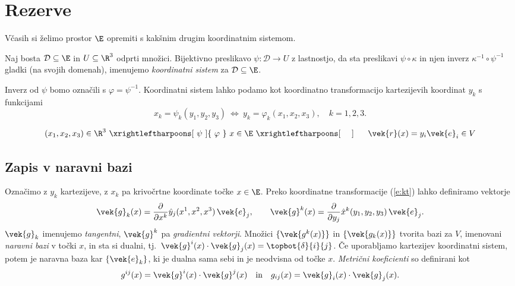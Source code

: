 \section{Rezerve}

Včasih si želimo prostor $\E$ opremiti s kakšnim drugim koordinatnim sistemom.
\begin{definicija}\label{d:ks}
	Naj bosta $\mathcal{D}\subseteq\E$ in $U\subseteq\R^3$ odprti množici. Bijektivno preslikavo
	$\psi\colon\mathcal{D}\to U$ z lastnostjo, da sta preslikavi $\psi\circ\kappa$ in njen inverz
	$\kappa^{-1}\circ\psi^{-1}$ gladki (na svojih domenah), imenujemo \emph{koordinatni sistem}
	za $\mathcal{D}\subseteq\E$.
\end{definicija}
Inverz od $\psi$ bomo označili s $\varphi=\psi^{-1}$.
Koordinatni sistem lahko podamo kot koordinatno transformacijo kartezijevih koordinat $y_k$ s funkcijami
\begin{equation*}
	x_k = \psi_k(y_1,y_2,y_3) \ \Leftrightarrow \ y_k=\varphi_k(x_1,x_2,x_3), \quad k=1,2,3.
\end{equation*}

\[
	(x_1,x_2,x_3)\in \R^3\ \xrightleftharpoons[\ \psi\ ]{\ \varphi\ }\ 
	x\in\E\ \xrightleftharpoons[\ \phantom{\varphi}\ ]{\ \phantom{\psi}\ }\ 
	\vek{r}(x)=y_i\vek{e}_i \in V
\]

\subsection{Zapis v naravni bazi}

Označimo z $y_k$ kartezijeve, z $x_k$ pa krivočrtne koordinate točke $x\in\E$.
Preko koordinatne transformacije (\ref{e:kt}) lahko definiramo vektorje
\begin{align*}
	\vek{g}_k(x)=\frac{\partial}{\partial x^k}\hat{y}_j(x^1,x^2,x^3)\,\vek{e}_j, \qquad
	\vek{g}^k(x)=\frac{\partial}{\partial y_j}\hat{x}^k(y_1,y_2,y_3)\,\vek{e}_j.
\end{align*}
$\vek{g}_k$ imenujemo \emph{tangentni}, $\vek{g}^k$ pa \emph{gradientni vektorji}.
Množici $\{\vek{g^k(x)}\}$ in $\{\vek{g_k(x)}\}$ tvorita bazi za $V$, imenovani \emph{naravni bazi} v točki $x$,
in sta si dualni, tj.~$\vek{g}^i(x)\cdot\vek{g}_j(x)=\topbot{\delta}{i}{j}$.
Če uporabljamo kartezijev koordinatni sistem, potem je naravna baza kar $\{\vek{e}_k\}$, ki je dualna sama sebi
in je neodvisna od točke $x$.
\emph{Metrični koeficienti} so definirani kot
\begin{equation}\label{e:g}
	g^{ij}(x)=\vek{g}^i(x)\cdot\vek{g}^j(x) \quad\mathrm{in}\quad g_{ij}(x)=\vek{g}_i(x)\cdot\vek{g}_j(x).
\end{equation}


